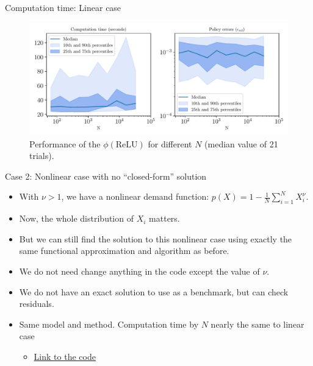 \documentclass[aspectratio=169,10pt]{beamer}
\begin{document}
			\begin{frame}{Computation time: Linear case}
			
			\begin{figure}[h!]
			\centering
			\includegraphics[width=\linewidth]{./figures/deep-sets-linear-profiling-var-n}
			\caption{Performance of the $\phi(\text{ReLU})$ for different $N$ (median value of 21 trials).}
			\end{figure}	
			
			\end{frame}
				\begin{frame}{Case 2: Nonlinear case with no ``closed-form'' solution}
				
				\begin{itemize}
				
				\item With $\nu>1$, we have a nonlinear demand function:  $p(X) = 1 -  \frac{1}{N}\sum_{i=1}^N X_i^{\nu}$.\vspace{0.1in}
				
				\item Now, the whole distribution  of $X_i$ matters.\vspace{0.1in}
				
				\item But we can still find the solution to this nonlinear case using exactly the same functional approximation and algorithm as before.\vspace{0.1in}    
				
				\item We do not need change anything in the code except the value of $\nu$.\vspace{0.1in}   
				
				\item We do not have an exact solution to use as a benchmark, but can check residuals.\vspace{0.1in}
				
				\item Same model and method.  Computation time by $N$ nearly the same to linear case
			\begin{itemize}
				\item \href{https://github.com/HighDimensionalEconLab/symmetry_dynamic_programming/blob/main/demo_notebooks/investment_euler_demo.ipynb}{Link to the code}
			\end{itemize}
				\end{itemize}
				
				\end{frame}
	
\end{document}
